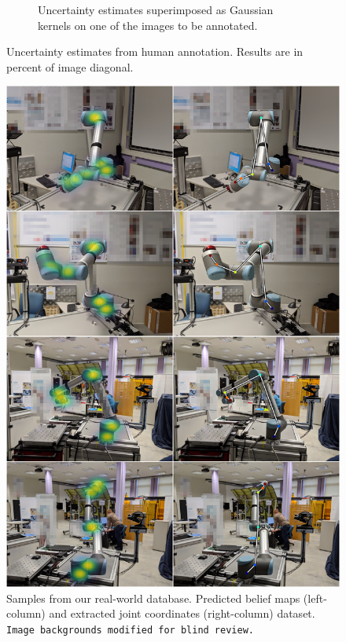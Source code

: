 \documentclass[conference]{IEEEtran}
\begin{document}
\begin{figure}[!h]
\begin{subfigure}[t]{0.49\columnwidth}
            \caption {
                \label{fig:humanuncertainty_belief} 
                Uncertainty estimates superimposed as Gaussian kernels on one of the images to be annotated.
            }
        \end{subfigure}
        \caption {
            \label{fig:uncertainty} 
            Uncertainty estimates from human annotation. Results are in percent of image diagonal.
        }
    \end{figure}

    \begin{figure}[htbp]
        \centerline{
            \includegraphics[width=0.98\columnwidth]{figures/results/ur10_lab/mosaic_blind.png}}
        \caption{
            \label{fig:posresults} Samples from our real-world database. Predicted belief maps (left-column) and extracted joint coordinates (right-column) dataset. \texttt{Image backgrounds modified for blind review.}
        }
    \end{figure}
\end{document}
